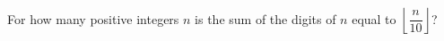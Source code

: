 For how many positive integers $n$ is the sum of the digits of $n$ equal to $\left\lfloor\dfrac n{10}\right\rfloor$?
